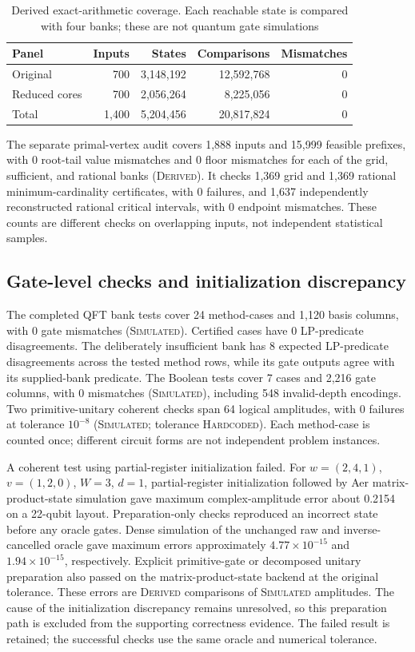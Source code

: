 \documentclass[referee,pdflatex,sn-mathphys-num]{sn-jnl}
\theoremstyle{thmstyleone}
\theoremstyle{thmstyletwo}
\begin{document}
\begin{table}[t]
\caption{Derived exact-arithmetic coverage. Each reachable state is compared with four banks; these are not quantum gate simulations}\label{tab:coverage}
\centering\small
\begin{tabular}{lrrrr}
\toprule
Panel & Inputs & States & Comparisons & Mismatches\\
\midrule
Original & 700 & 3,148,192 & 12,592,768 & 0\\
Reduced cores & 700 & 2,056,264 & 8,225,056 & 0\\
Total & 1,400 & 5,204,456 & 20,817,824 & 0\\
\bottomrule
\end{tabular}
\end{table}

The separate primal-vertex audit covers 1,888 inputs and 15,999 feasible prefixes, with 0 root-tail value mismatches and 0 floor mismatches for each of the grid, sufficient, and rational banks (\textsc{Derived}). It checks 1,369 grid and 1,369 rational minimum-cardinality certificates, with 0 failures, and 1,637 independently reconstructed rational critical intervals, with 0 endpoint mismatches. These counts are different checks on overlapping inputs, not independent statistical samples.

\subsection{Gate-level checks and initialization discrepancy}
The completed QFT bank tests cover 24 method-cases and 1,120 basis columns, with 0 gate mismatches (\textsc{Simulated}). Certified cases have 0 LP-predicate disagreements. The deliberately insufficient bank has 8 expected LP-predicate disagreements across the tested method rows, while its gate outputs agree with its supplied-bank predicate. The Boolean tests cover 7 cases and 2,216 gate columns, with 0 mismatches (\textsc{Simulated}), including 548 invalid-depth encodings. Two primitive-unitary coherent checks span 64 logical amplitudes, with 0 failures at tolerance $10^{-8}$ (\textsc{Simulated}; tolerance \textsc{Hardcoded}). Each method-case is counted once; different circuit forms are not independent problem instances.

A coherent test using partial-register initialization failed. For $w=(2,4,1)$, $v=(1,2,0)$, $W=3$, $d=1$, partial-register initialization followed by Aer matrix-product-state simulation gave maximum complex-amplitude error about 0.2154 on a 22-qubit layout. Preparation-only checks reproduced an incorrect state before any oracle gates. Dense simulation of the unchanged raw and inverse-cancelled oracle gave maximum errors approximately $4.77\times10^{-15}$ and $1.94\times10^{-15}$, respectively. Explicit primitive-gate or decomposed unitary preparation also passed on the matrix-product-state backend at the original tolerance. These errors are \textsc{Derived} comparisons of \textsc{Simulated} amplitudes. The cause of the initialization discrepancy remains unresolved, so this preparation path is excluded from the supporting correctness evidence. The failed result is retained; the successful checks use the same oracle and numerical tolerance.
\end{document}

